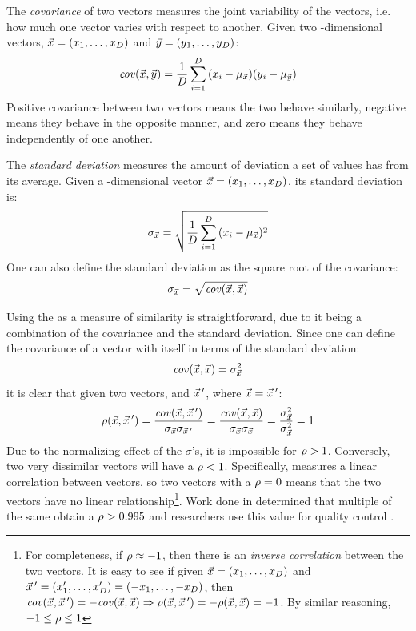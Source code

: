The \textit{covariance} of two vectors measures the joint variability of the vectors, i.e. how much one vector varies with respect to another.
Given two \numdims{}-dimensional vectors, $\vec{x}{}=(x{}_1,\dots,x{}_{D})$ and $\vec{y}{}=(y{}_1,\dots,y{}_{D})$:
\begin{equation}
    \mathit{cov}(\vec{x{}}, \vec{y{}}) =  \frac{1}{D{}}\sum_{i=1}^{D}{}(x{}_i - \mu_{\vec{x{}}})(y{}_i - \mu_{\vec{y{}}}) 
\end{equation}
Positive covariance between two vectors means the two behave similarly, negative means they behave in the opposite manner, and zero means they behave independently of one another. 

The \textit{standard deviation} measures the amount of deviation a set of values has from its average.
Given a \numdims{}-dimensional vector $\vec{x}{}=(x{}_1,\dots,x{}_{D})$, its standard deviation is:
\begin{equation}
    \sigma_{\vec{x{}}} =  \sqrt{\frac{1}{D{}}\sum_{i=1}^{D}{}(x{}_i - \mu_{\vec{x{}}})^2}  
\end{equation}
One can also define the standard deviation as the square root of the covariance:
\begin{equation}
    \sigma_{\vec{x{}}} = \sqrt{\mathit{cov}(\vec{x{}}, \vec{x{}})}
\end{equation}

Using the \pearson{} as a measure of similarity is straightforward, due to it being a combination of the covariance and the standard deviation.
Since one can define the covariance of a vector with itself in terms of the standard deviation:
\begin{equation}
    \mathit{cov}(\vec{x{}}, \vec{x{}}) = \sigma_{\vec{x{}}}^2
\end{equation}
it is clear that given two vectors, \pcveca{} and $\vec{x}{}\,'$, where $\vec{x}{} = \vec{x}\,'{}$:
\begin{equation}
    \rho({\vec{x}{}},{\vec{x}\,'{}})
    = \frac{\mathit{cov}(\vec{x}{}, \vec{x}\,'{})}{\sigma_{\vec{x}{}}\sigma_{\vec{x}\,'{}}}
    = \frac{\mathit{cov}(\vec{x}{}, \vec{x}{})}{\sigma_{\vec{x}{}}\sigma_{\vec{x}{}}}
    = \frac{\sigma_{\vec{x}{}}^2}{\sigma_{\vec{x}{}}^2}
    = 1
\end{equation}
Due to the normalizing effect of the $\sigma{}$'s, it is impossible for $\rho{} > 1$.
Conversely, two very dissimilar vectors will have a $\rho{} < 1$.
Specifically, \pearson{} measures a linear correlation between vectors, so two vectors with a $\rho{} = 0$ means that the two vectors have no linear relationship\footnote{For completeness, if $\rho{} \approx -1$, then there is an \textit{inverse correlation} between the two vectors. It is easy to see if 
given $\vec{x}{} = (x{}_1,\dots,x{}_{D}{})$
and $\vec{x}\,'{}=(x{}'_1,\dots,x{}'_{D}{}) = (-x{}_1,\dots,-x{}_{D}{})$,
then $\mathit{cov}(\vec{x}{}, \vec{x}\,'{}) = -\mathit{cov}(\vec{x{}}, \vec{x{}})\Rightarrow\rho{(\ensuremath{\vec{x}}{}, \ensuremath{\vec{x}\,'}{}) = -\ensuremath{\rho{}(\vec{x{}}, \vec{x{}})}} = -1$. By similar reasoning, $-1 \leq \rho{} \leq 1$
}.
Work done in \cite{Shealy:SeniorProject} determined that multiple \pyros{} of the same \isol{} obtain a $\rho{} > 0.995$ and \cplop{} researchers use this value for quality control \cite{Black2014121, kent2014pyroprinting}.

